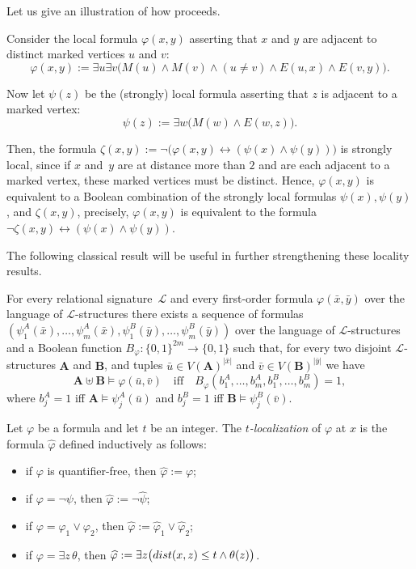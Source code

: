 \documentclass{lmcs}
\renewcommand{\phi}{\varphi}
\theoremstyle{definition}
\DeclareMathOperator{\union}{\uplus}
\begin{document}
Let us give an illustration of how  proceeds.
\begin{exa}
	Consider the local formula $\varphi(x,y)$ asserting that $x$ and $y$ are adjacent to distinct marked vertices $u$ and $v$:
\[
\varphi(x,y):=\exists u\exists v \big(M(u)\wedge M(v)\wedge (u\neq v)\wedge E(u,x)\wedge E(v,y)\big).
\]

Now let $\psi(z)$ be the (strongly) local formula asserting that $z$ is adjacent to a marked vertex:
\[
\psi(z):=\exists w \big(M(w)\wedge E(w,z)\big).
\]

Then, the formula $\zeta(x,y):=\neg \big(\phi(x,y)\leftrightarrow (\psi(x)\wedge \psi(y))\big)$ is strongly local, since if $x$ and~$y$ are at distance more than $2$ and are each adjacent to a marked vertex, these marked vertices must be distinct.
Hence, $\phi(x,y)$ is equivalent to a Boolean combination of the strongly local formulas $\psi(x),\psi(y)$, and $\zeta(x,y)$, precisely,
$\phi(x,y)$ is equivalent to  the formula 
$\neg \zeta(x,y)\leftrightarrow(\psi(x)\wedge \psi(y))$.


\medskip
The following classical result will be useful in further strengthening these locality results.

\begin{thm}
	\label{thm:FV}
	For every relational signature~$\mathcal L$ and every first-order formula $\phi(\bar x,\bar y)$ 	over the language of \mbox{$\mathcal L$-structures} there exists a sequence of formulas
	$(\psi_1^A(\bar x),\dots,\psi_m^A(\bar x),\psi_1^B(\bar y),\dots,\psi_m^B(\bar y))$ 	over the language of $\mathcal L$-structures and a Boolean function \mbox{$B_\phi:\{0,1\}^{2m}\rightarrow\{0,1\}$} such that, for every two disjoint $\mathcal L$-structures $\mathbf A$ and $\mathbf B$, and tuples $\bar u\in V(\mathbf{A})^{|\bar x|}$ and $\bar v\in V(\mathbf{B})^{|\bar y|}$ we have
\[
		\mathbf A \union\mathbf B\models \phi(\bar u,\bar v)\quad
		\text{iff}\quad
		B_\phi(b_1^A,\dots,b_m^A,b_1^B,\dots,b_m^B)=1,
		\]
	where $b_j^A=1$ iff $\mathbf A\models \psi_j^A(\bar u)$ and 
	$b_j^B=1$ iff $\mathbf B\models\psi_j^B(\bar v)$.
\end{thm}

Let $\phi$ be a formula and let $t$ be an integer. The \emph{$t$-localization} of $\phi$ at $x$ is the formula $\widehat\phi$  defined inductively as follows:
\begin{itemize}
	\item if $\phi$ is quantifier-free, then $\widehat\phi:=\phi$;
		\item if $\phi=\neg\psi$, then $\widehat\phi:=\neg\widehat\psi$;
	\item if $\phi=\phi_1\vee\phi_2$, then $\widehat\phi:=\widehat\phi_1\vee\widehat\phi_2$;
	\item if $\phi=\exists z\, \theta$, then $\widehat \phi:=\exists z \big({\rm dist}(x,z)\leq t\wedge\theta(z)\big)$.
\end{itemize}


\end{exa}
\end{document}
